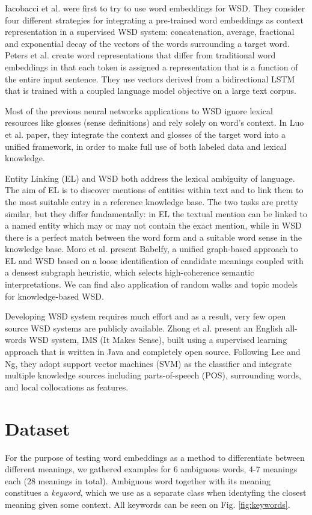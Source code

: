 \documentclass{llncs}
\begin{document}
Iacobacci et al.\cite{embeddingsforWSD} were first to try to use word embeddings for WSD. They consider four different strategies for integrating a pre-trained word embeddings as context representation in a supervised WSD system: concatenation, average, fractional and exponential decay of the vectors of the words surrounding a target word.
Peters et al.\cite{deepcontext} create word representations that differ from traditional word embeddings in that each token is assigned a representation that is a function of the entire input sentence. They use vectors derived from a bidirectional LSTM that is trained with a coupled language model objective on a large text corpus.

Most of the previous neural networks applications to WSD ignore lexical resources like glosses (sense definitions) and rely solely on word's context. In Luo et al.\cite{glosses} paper, they integrate the context and glosses of the target word into a unified framework, in order to make full use of both labeled data and lexical knowledge.

Entity Linking (EL) and WSD both address the lexical ambiguity of language. The aim of EL is to discover mentions of entities within text and to link them to the most suitable entry in a reference knowledge base. The two tasks are pretty similar, but they differ fundamentally: in EL the textual mention can be linked to a named entity which may or may not contain the exact mention, while in WSD there is a perfect match between the word form and a suitable word sense in the knowledge base.
Moro et al.\cite{babelfy} present Babelfy, a unified graph-based approach to EL and WSD based on a loose identification of candidate meanings coupled with a densest subgraph heuristic, which selects high-coherence semantic interpretations.
We can find also application of random walks\cite{randomwalks} and topic models\cite{topicmodels} for knowledge-based WSD.

Developing WSD system requires much effort and as a result, very few open source WSD systems are publicly available. Zhong et al.\cite{itmakessense} present an English all-words WSD system, IMS (It Makes Sense), built using a supervised learning approach that is written in Java and completely open source. Following Lee and Ng\cite{SVMtoWSD}, they adopt support vector machines (SVM) as the classifier and integrate multiple knowledge sources including parts-of-speech (POS), surrounding words, and local collocations as features.

\section{Dataset}
\label{sec:dataset}
For the purpose of testing word embeddings as a method to differentiate between different meanings, we gathered examples for 6 ambiguous words, 4-7 meanings each (28 meanings in total).
Ambiguous word together with its meaning constitues a \textit{keyword}, which we use as a separate class when identyfing the closest meaning given some context.
All keywords can be seen on Fig. \ref{fig:keywords}.
\end{document}
